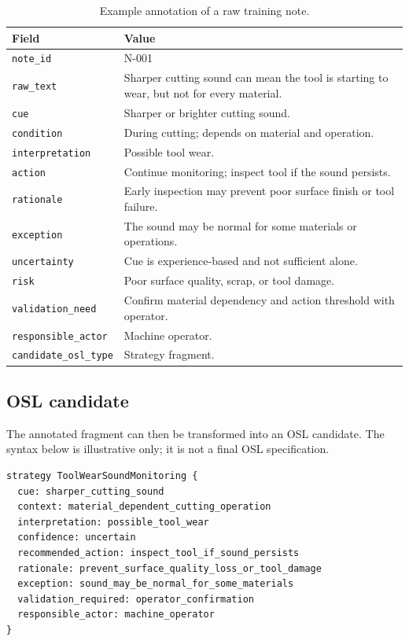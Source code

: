 \begin{table}[htbp]
\centering
\caption{Example annotation of a raw training note.}
\label{tab:annotated-fragment}
\begin{tabularx}{\textwidth}{p{}X}
\toprule
Field & Value \\
\midrule
\texttt{note\_id} & N-001 \\
\texttt{raw\_text} & Sharper cutting sound can mean the tool is starting to wear, but not for every material. \\
\texttt{cue} & Sharper or brighter cutting sound. \\
\texttt{condition} & During cutting; depends on material and operation. \\
\texttt{interpretation} & Possible tool wear. \\
\texttt{action} & Continue monitoring; inspect tool if the sound persists. \\
\texttt{rationale} & Early inspection may prevent poor surface finish or tool failure. \\
\texttt{exception} & The sound may be normal for some materials or operations. \\
\texttt{uncertainty} & Cue is experience-based and not sufficient alone. \\
\texttt{risk} & Poor surface quality, scrap, or tool damage. \\
\texttt{validation\_need} & Confirm material dependency and action threshold with operator. \\
\texttt{responsible\_actor} & Machine operator. \\
\texttt{candidate\_osl\_type} & Strategy fragment. \\
\bottomrule
\end{tabularx}
\end{table}

\subsection{OSL candidate}

The annotated fragment can then be transformed into an OSL candidate. The syntax below is illustrative only; it is not a final OSL specification.

\begin{lstlisting}[style=osl,caption={Illustrative OSL candidate generated from the annotated note.},label={lst:osl-candidate}]
strategy ToolWearSoundMonitoring {
  cue: sharper_cutting_sound
  context: material_dependent_cutting_operation
  interpretation: possible_tool_wear
  confidence: uncertain
  recommended_action: inspect_tool_if_sound_persists
  rationale: prevent_surface_quality_loss_or_tool_damage
  exception: sound_may_be_normal_for_some_materials
  validation_required: operator_confirmation
  responsible_actor: machine_operator
}
\end{lstlisting}

